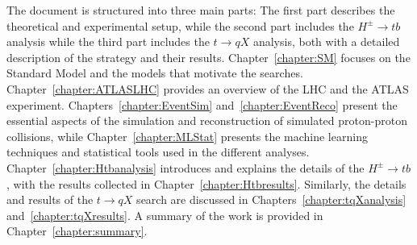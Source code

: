 The document is structured into three main parts: The first part describes the theoretical and experimental setup, while the second part includes the $H^\pm\to tb$ analysis while the third part includes the $t\to qX$ analysis, both with a detailed description of the strategy and their results. Chapter~\ref{chapter:SM} focuses on the Standard Model and the models that motivate the searches. Chapter~\ref{chapter:ATLASLHC} provides an overview of the LHC and the ATLAS experiment. Chapters~\ref{chapter:EventSim} and~\ref{chapter:EventReco} present the essential aspects of the simulation and reconstruction of simulated proton-proton collisions, while Chapter~\ref{chapter:MLStat} presents the machine learning techniques and statistical tools used in the different analyses. Chapter~\ref{chapter:Htbanalysis} introduces and explains the details of the $H^\pm\to tb$, with the results collected in Chapter~\ref{chapter:Htbresults}. Similarly, the details and results of the $t\to qX$ search are discussed in Chapters~\ref{chapter:tqXanalysis} and~\ref{chapter:tqXresults}. A summary of the work is provided in Chapter~\ref{chapter:summary}.